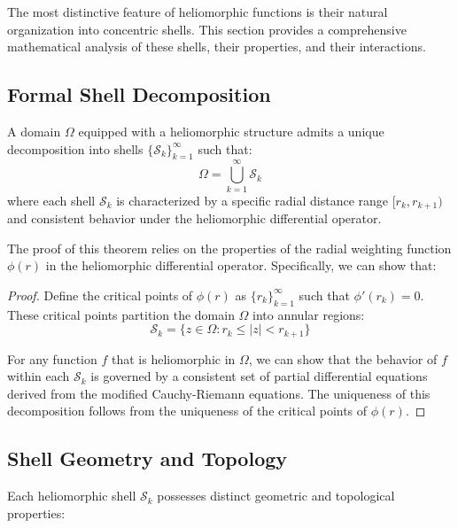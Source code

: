 The most distinctive feature of heliomorphic functions is their natural organization into concentric shells. This section provides a comprehensive mathematical analysis of these shells, their properties, and their interactions.

\subsection{Formal Shell Decomposition}

\begin{theorem}
A domain $\Omega$ equipped with a heliomorphic structure admits a unique decomposition into shells $\{\mathcal{S}_k\}_{k=1}^{\infty}$ such that:
\begin{equation}
\Omega = \bigcup_{k=1}^{\infty} \mathcal{S}_k
\end{equation}
where each shell $\mathcal{S}_k$ is characterized by a specific radial distance range $[r_k, r_{k+1})$ and consistent behavior under the heliomorphic differential operator.
\end{theorem}

The proof of this theorem relies on the properties of the radial weighting function $\phi(r)$ in the heliomorphic differential operator. Specifically, we can show that:

\begin{proof}
Define the critical points of $\phi(r)$ as $\{r_k\}_{k=1}^{\infty}$ such that $\phi'(r_k) = 0$. These critical points partition the domain $\Omega$ into annular regions:
\begin{equation}
\mathcal{S}_k = \{z \in \Omega : r_k \leq |z| < r_{k+1}\}
\end{equation}

For any function $f$ that is heliomorphic in $\Omega$, we can show that the behavior of $f$ within each $\mathcal{S}_k$ is governed by a consistent set of partial differential equations derived from the modified Cauchy-Riemann equations. The uniqueness of this decomposition follows from the uniqueness of the critical points of $\phi(r)$.
\end{proof}

\subsection{Shell Geometry and Topology}

Each heliomorphic shell $\mathcal{S}_k$ possesses distinct geometric and topological properties:

